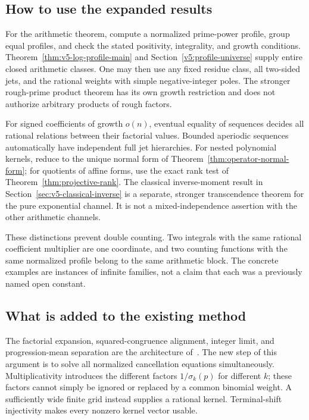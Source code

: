 \subsection{How to use the expanded results}
For the arithmetic theorem, compute a normalized prime-power profile,
group equal profiles, and check the stated positivity, integrality, and
growth conditions. Theorem~\ref{thm:v5-log-profile-main} and
Section~\ref{v5:profile-universe} supply entire closed arithmetic classes.
One may then use any fixed residue class, all two-sided jets, and the
rational weights with simple negative-integer poles. The stronger
rough-prime product theorem has its own growth restriction and does not
authorize arbitrary products of rough factors.

For signed coefficients of growth $o(n)$, eventual equality of sequences
decides all rational relations between their factorial values. Bounded
aperiodic sequences automatically have independent full jet hierarchies.
For nested polynomial kernels, reduce to the unique normal form of
Theorem~\ref{thm:operator-normal-form}; for quotients of affine forms,
use the exact rank test of Theorem~\ref{thm:projective-rank}.
The classical inverse-moment result in
Section~\ref{sec:v5-classical-inverse} is a separate, stronger
transcendence theorem for the pure exponential channel. It is not a
mixed-independence assertion with the other arithmetic channels.

These distinctions prevent double counting. Two integrals with the same
rational coefficient multiplier are one coordinate, and two counting
functions with the same normalized profile belong to the same arithmetic
block. The concrete examples are instances of infinite families, not a
claim that each was a previously named open constant.

\subsection{What is added to the existing method}
The factorial expansion, squared-congruence alignment, integer limit,
and progression-mean separation are the architecture of~\cite{TG}.
The new step of this argument is to solve all normalized cancellation
equations simultaneously. Multiplicativity introduces the different
factors $1/\sigma_k(p)$ for different $k$; these factors cannot simply
be ignored or replaced by a common binomial weight. A sufficiently
wide finite grid instead supplies a rational kernel. Terminal-shift
injectivity makes every nonzero kernel vector usable.

